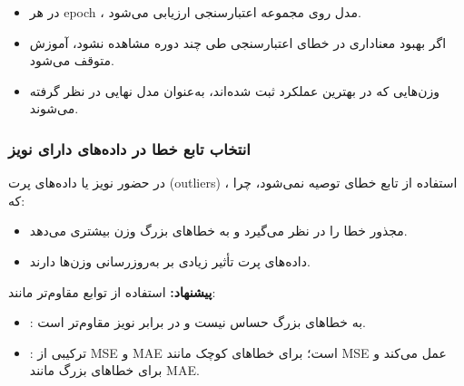 \begin{itemize}
	\item در هر epoch ، مدل روی مجموعه اعتبارسنجی ارزیابی می‌شود.
	\item اگر بهبود معناداری در خطای اعتبارسنجی طی چند دوره مشاهده نشود، آموزش متوقف می‌شود.
	\item وزن‌هایی که در بهترین عملکرد ثبت شده‌اند، به‌عنوان مدل نهایی در نظر گرفته می‌شوند.
\end{itemize}

\subsubsection*{انتخاب تابع خطا در داده‌های دارای نویز}

در حضور نویز یا داده‌های پرت (outliers) ، استفاده از تابع خطای  توصیه نمی‌شود، چرا که:
\begin{itemize}
	\item {} مجذور خطا را در نظر می‌گیرد و به خطاهای بزرگ وزن بیشتری می‌دهد.
	\item داده‌های پرت تأثیر زیادی بر به‌روزرسانی وزن‌ها دارند.
\end{itemize}

\textbf{پیشنهاد:} استفاده از توابع مقاوم‌تر مانند:
\begin{itemize}
	\item {}: به خطاهای بزرگ حساس نیست و در برابر نویز مقاوم‌تر است.
	\item {}: ترکیبی از MSE و MAE است؛ برای خطاهای کوچک مانند MSE عمل می‌کند و برای خطاهای بزرگ مانند MAE.
\end{itemize}
